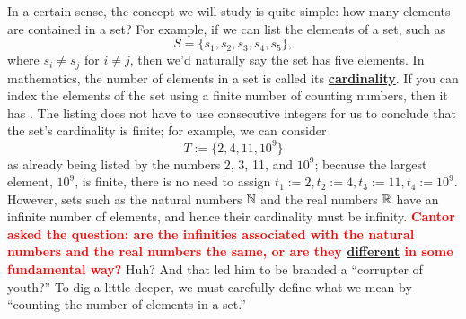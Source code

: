 In a certain sense, the concept we will study is quite simple: how many elements are contained in a set? For example, if we can list the elements of a set, such as
$$S = \{s_1, s_2, s_3, s_4, s_5\},$$
where $s_i \neq s_j$ for $i \neq j$, then we'd naturally say the set has five elements. In mathematics, the number of elements in a set is called its \href{https://simple.wikipedia.org/wiki/Cardinality}{\textbf{cardinality}}. If you can index the elements of the set using a finite number of counting numbers, then it has . The listing does not have to use consecutive integers for us to conclude that the set's cardinality is finite; for example, we can consider
$$ T:=\{ 2, 4, 11, 10^9\}$$
as already being listed by the numbers 2, 3, 11, and $10^9$; because the largest element, $10^9$, is finite, there is no need to assign $t_1:= 2, t_2:=4, t_3:=11, t_4:=10^9$.
However, sets such as the natural numbers $\mathbb N$ and the real numbers $\mathbb R$ have an infinite number of elements, and hence their cardinality must be infinity. \textcolor{red}{\bf Cantor asked the question: are the infinities associated with the natural numbers and the real numbers the same, or are they \href{https://youtu.be/elvOZm0d4H0}{different} in some fundamental way?} Huh? And that led him to be branded a ``corrupter of youth?'' To dig a little deeper, we must carefully define what we mean by ``counting the number of elements in a set.''


